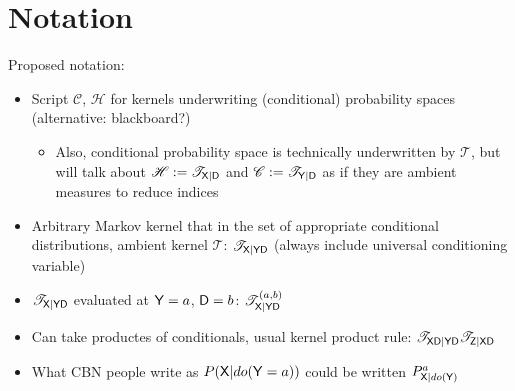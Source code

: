 
\section{Notation}

Proposed notation:

\begin{itemize}
	\item Script $\mathscr{C}$, $\mathscr{H}$ for kernels underwriting (conditional) probability spaces (alternative: blackboard?)
	\begin{itemize}
	 	\item Also, conditional probability space is technically underwritten by $\mathscr{T}$, but will talk about $\mathscr{H}:= \mathscr{T}_{\mathsf{X}|\mathsf{D}}$ and $\mathscr{C}:=\mathscr{T}_{\mathsf{Y}|\mathsf{D}}$ as if they are ambient measures to reduce indices
	\end{itemize}
	\item Arbitrary Markov kernel that in the set of appropriate conditional distributions, ambient kernel $\mathscr{T}$: $\mathscr{T}_{\mathsf{X}|\mathsf{Y}\mathsf{D}}$ (always include universal conditioning variable)
	\item $\mathscr{T}_{\mathsf{X}|\mathsf{Y}\mathsf{D}}$ evaluated at $\mathsf{Y}=a$, $\mathsf{D}=b$: $\mathscr{T}_{\mathsf{X}|\mathsf{Y}\mathsf{D}}^{(a,b)}$
	\item Can take productes of conditionals, usual kernel product rule: $\mathscr{T}_{\mathsf{X}\mathsf{D}|\mathsf{Y}\mathsf{D}}\mathscr{T}_{\mathsf{Z}|\mathsf{X}\mathsf{D}}$
	\item What CBN people write as $P(\mathsf{X}|do(\mathsf{Y}=a))$ could be written $P^a_{\mathsf{X}|do(\mathsf{Y})}$
\end{itemize}